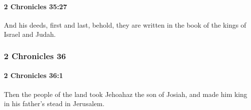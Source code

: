 		\paragraph{2 Chronicles 35:27} %
			\label{2CHRONICLES-35-27}

			And his deeds, first and last, behold, they are written in the book of the kings of Israel and Judah.

	\subsubsection{2 Chronicles 36} %
		\label{2CHRONICLES-36}

		\paragraph{2 Chronicles 36:1} %
			\label{2CHRONICLES-36-1}

			Then the people of the land took Jehoahaz the son of Josiah, and made him king in his father's stead in Jerusalem.

